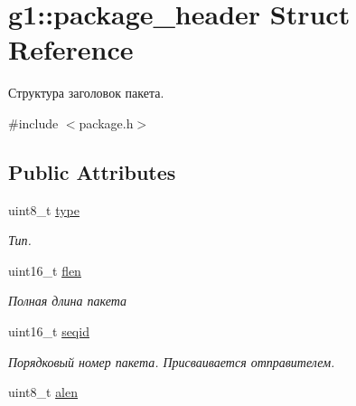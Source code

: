 \hypertarget{structg1_1_1package__header}{}\section{g1\+:\+:package\+\_\+header Struct Reference}
\label{structg1_1_1package__header}


Структура заголовок пакета.  




{\ttfamily \#include $<$package.\+h$>$}

\subsection*{Public Attributes}
\begin{DoxyCompactItemize}
\item 
uint8\+\_\+t \hyperlink{structg1_1_1package__header_a77aeda3b76d39b1067afd494c58873af}{type}\hypertarget{structg1_1_1package__header_a77aeda3b76d39b1067afd494c58873af}{}\label{structg1_1_1package__header_a77aeda3b76d39b1067afd494c58873af}

\begin{DoxyCompactList}\small\item\em Тип. \end{DoxyCompactList}\item 
uint16\+\_\+t \hyperlink{structg1_1_1package__header_a148b733fe97c06f0ded129f2a1d953c1}{flen}\hypertarget{structg1_1_1package__header_a148b733fe97c06f0ded129f2a1d953c1}{}\label{structg1_1_1package__header_a148b733fe97c06f0ded129f2a1d953c1}

\begin{DoxyCompactList}\small\item\em Полная длина пакета \end{DoxyCompactList}\item 
uint16\+\_\+t \hyperlink{structg1_1_1package__header_a8f706d30ff3d9154aff97827aa291af8}{seqid}\hypertarget{structg1_1_1package__header_a8f706d30ff3d9154aff97827aa291af8}{}\label{structg1_1_1package__header_a8f706d30ff3d9154aff97827aa291af8}

\begin{DoxyCompactList}\small\item\em Порядковый номер пакета. Присваивается отправителем. \end{DoxyCompactList}\item 
uint8\+\_\+t \hyperlink{structg1_1_1package__header_aca2dc89b824e81d9aaa99488aab21fe7}{alen}\hypertarget{structg1_1_1package__header_aca2dc89b824e81d9aaa99488aab21fe7}{}\label{structg1_1_1package__header_aca2dc89b824e81d9aaa99488aab21fe7}


\end{DoxyCompactItemize}
